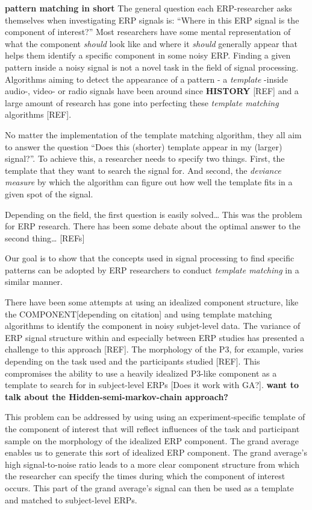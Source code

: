\documentclass[
  man,floatsintext]{apa7}
\begin{document}
\textbf{pattern matching in short}
The general question each ERP-researcher asks themselves when investigating ERP signals is: ``Where in this ERP signal is the component of interest?'' Most researchers have some mental representation of what the component \emph{should} look like and where it \emph{should} generally appear that helps them identify a specific component in some noisy ERP.
Finding a given pattern inside a noisy signal is not a novel task in the field of signal processing. Algorithms aiming to detect the appearance of a pattern - a \emph{template} -inside audio-, video- or radio signals have been around since \textbf{HISTORY} {[}REF{]} and a large amount of research has gone into perfecting these \emph{template matching} algorithms {[}REF{]}.

No matter the implementation of the template matching algorithm, they all aim to answer the question ``Does this (shorter) template appear in my (larger) signal?''. To achieve this, a researcher needs to specify two things. First, the template that they want to search the signal for. And second, the \emph{deviance measure} by which the algorithm can figure out how well the template fits in a given spot of the signal.

Depending on the field, the first question is easily solved\ldots{} This was the problem for ERP research.
There has been some debate about the optimal answer to the second thing\ldots{} {[}REFs{]}

Our goal is to show that the concepts used in signal processing to find specific patterns can be adopted by ERP researchers to conduct \emph{template matching} in a similar manner.

There have been some attempts at using an idealized component structure, like the COMPONENT{[}depending on citation{]} and using template matching algorithms to identify the component in noisy subjet-level data. The variance of ERP signal structure within and especially between ERP studies has presented a challenge to this approach {[}REF{]}. The morphology of the P3, for example, varies depending on the task used and the participants studied {[}REF{]}. This compromises the ability to use a heavily idealized P3-like component as a template to search for in subject-level ERPs {[}Does it work with GA?{]}. \textbf{want to talk about the Hidden-semi-markov-chain approach?}

This problem can be addressed by using using an experiment-specific template of the component of interest that will reflect influences of the task and participant sample on the morphology of the idealized ERP component. The grand average enables us to generate this sort of idealized ERP component. The grand average's high signal-to-noise ratio leads to a more clear component structure from which the researcher can specify the times during which the component of interest occurs. This part of the grand average's signal can then be used as a template and matched to subject-level ERPs.
\end{document}
